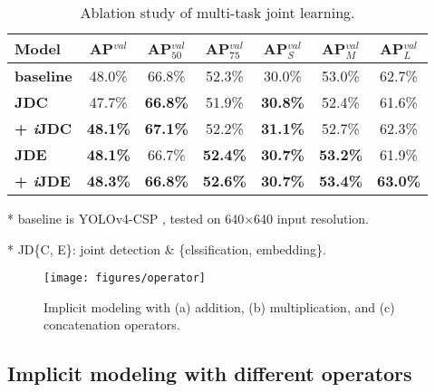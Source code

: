 \documentclass[10pt,twocolumn,letterpaper]{article}
\begin{document}
\begin{table}[h]
	\centering
	\begin{threeparttable}[h]
		\footnotesize
		\caption{Ablation study of multi-task joint learning.}
		\label{table:e3}
		\setlength\tabcolsep{4.5pt}
		\begin{tabular}{lcccccc}
			\toprule
			\textbf{Model} & \textbf{AP$^{val}$} & \textbf{AP$^{val}_{50}$} & \textbf{AP$^{val}_{75}$} & \textbf{AP$^{val}_{S}$} & \textbf{AP$^{val}_{M}$} & \textbf{AP$^{val}_{L}$} \\				
			\midrule
			\textbf{baseline} & 48.0\% & 66.8\% & 52.3\% & 30.0\% & 53.0\% & 62.7\% \\				
			\midrule
			\textbf{JDC} & 47.7\% & \textbf{66.8\%} & 51.9\% & \textbf{30.8\%} & 52.4\% & 61.6\% \\
			\textbf{+ \textit{i}JDC} & \textbf{48.1\%} & \textbf{67.1\%} & 52.2\% & \textbf{31.1\%} & 52.7\% & 62.3\% \\				
			\midrule
			\textbf{JDE} & \textbf{48.1\%} & 66.7\% & \textbf{52.4\%} & \textbf{30.7\%} & \textbf{53.2\%} & 61.9\% \\
			\textbf{+ \textit{i}JDE} & \textbf{48.3\%} & \textbf{66.8\%} & \textbf{52.6\%} & \textbf{30.7\%} & \textbf{53.4\%} & \textbf{63.0\%} \\				
			\bottomrule
		\end{tabular}
		\begin{tablenotes}[flushleft]
		\footnotesize
		\item[*] baseline is YOLOv4-CSP \cite{wang2020scaled}, tested on 640$\times$640 input resolution.
		\item[*] JD\{C, E\}: joint detection \& \{clssification, embedding\}.
	\end{tablenotes}
	\end{threeparttable}
\end{table}

\begin{figure}[h]
\begin{center}
	\texttt{[image: figures/operator]}
\end{center}
\caption{Implicit modeling with (a) addition, (b) multiplication, and (c) concatenation operators.}
\label{fig:opr}
\end{figure}

\newpage

\subsection{Implicit modeling with different operators}
\label{sec:imo}
\end{document}
